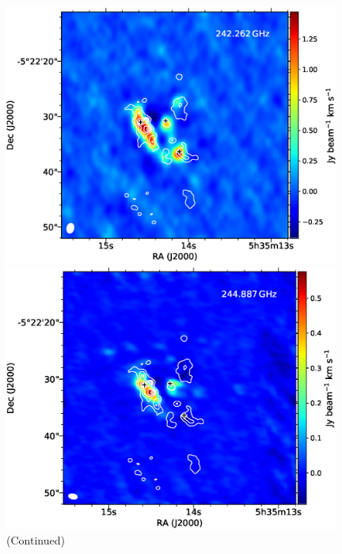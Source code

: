 \begin{figure}[htbp]
\begin{center}
\begin{minipage}{0.98\textwidth} 
\begin{center}
\begin{minipage}{0.48\textwidth}
\begin{center}
\includegraphics[width=0.98\textwidth]{OrionKL/mom0/242.262SV_mom0_3-7.eps}
\end{center}
\end{minipage}
\begin{minipage}{0.48\textwidth}
\begin{center}
\includegraphics[width=0.98\textwidth]{OrionKL/mom0/244.887mom0_3-7.eps}
\end{center}
\end{minipage}
\end{center}
\end{minipage}

\caption{(Continued)}
\end{center}
\end{figure}

